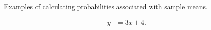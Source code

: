

\begin{problem}
\item Examples of calculating probabilities associated with sample means.

  \begin{subproblem}
  \item 
    \begin{eqnarray}
      y & = 3x + 4.
    \end{eqnarray}
    \vfill
  \end{subproblem}


\end{problem}



